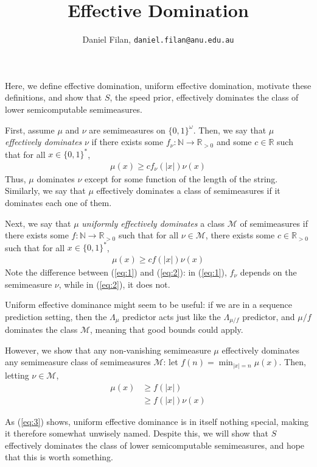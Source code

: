 \documentclass[12pt]{article}
\title{Effective Domination}
\author{Daniel Filan, \texttt{daniel.filan@anu.edu.au}}
\date{}
\newcommand\R{\mathbb{R}}
\newcommand\N{\mathbb{N}}
\begin{document}
 
\maketitle

Here, we define effective domination, uniform effective domination, motivate these definitions, and show that $S$, the speed prior, effectively dominates the class of lower semicomputable semimeasures.

First, assume $\mu$ and $\nu$ are semimeasures on $\{0,1\}^\omega$. Then, we say that $\mu$ \textit{effectively dominates} $\nu$ if there exists some $f_{\nu} : \N \rightarrow \R_{>0}$ and some $c \in \R$ such that for all $x \in \{0,1\}^*$,
\begin{align}
  \mu(x) \geq c f_\nu(|x|) \nu(x)\label{eq:1}
\end{align}
Thus, $\mu$ dominates $\nu$ except for some function of the length of the string. Similarly, we say that $\mu$ effectively dominates a class of semimeasures if it dominates each one of them.

Next, we say that $\mu$ \textit{uniformly effectively dominates} a class $\mathcal{M}$ of semimeasures if there exists some $f: \N \rightarrow \R_{>0}$ such that for all $\nu \in \mathcal{M}$, there exists some $c \in \R_{>0}$ such that for all $x \in \{0,1\}^*$,
\begin{align}
  \mu(x) \geq c f(|x|) \nu(x) \label{eq:2}
\end{align}
Note the difference between (\ref{eq:1}) and (\ref{eq:2}): in (\ref{eq:1}), $f_\nu$ depends on the semimeasure $\nu$, while in (\ref{eq:2}), it does not.

Uniform effective dominance might seem to be useful: if we are in a sequence prediction setting, then the $\Lambda_\mu$ predictor acts just like the $\Lambda_{\mu/f}$ predictor, and $\mu/f$ dominates the class $\mathcal{M}$, meaning that good bounds could apply.

However, we show that any non-vanishing semimeasure $\mu$ effectively dominates any semimeasure class of semimeasures $\mathcal{M}$: let $f(n) = \min_{|x| = n}\mu(x)$. Then, letting $\nu \in \mathcal{M}$,
\begin{align}
  \mu(x) &\geq f(|x|) \nonumber \\
  &\geq f(|x|) \nu(x) \label{eq:3}
\end{align}

As (\ref{eq:3}) shows, uniform effective dominance is in itself nothing special, making it therefore somewhat unwisely named. Despite this, we will show that $S$ effectively dominates the class of lower semicomputable semimeasures, and hope that this is worth something.
\end{document}
